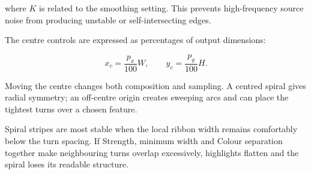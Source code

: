 where $K$ is related to the smoothing setting. This prevents high-frequency source noise from producing unstable or self-intersecting edges.

The centre controls are expressed as percentages of output dimensions:

\begin{equation}
x_c=\frac{p_x}{100}W,
\qquad
y_c=\frac{p_y}{100}H.
\end{equation}

Moving the centre changes both composition and sampling. A centred spiral gives radial symmetry; an off-centre origin creates sweeping arcs and can place the tightest turns over a chosen feature.

\begin{tipbox}
Spiral stripes are most stable when the local ribbon width remains comfortably below the turn spacing. If Strength, minimum width and Colour separation together make neighbouring turns overlap excessively, highlights flatten and the spiral loses its readable structure.
\end{tipbox}

\clearpage
